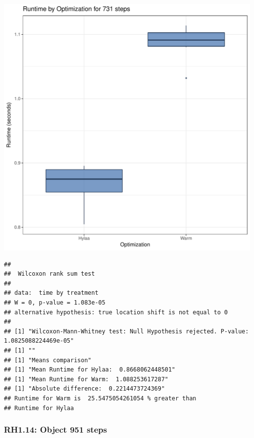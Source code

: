 \documentclass{article}\usepackage[]{graphicx}\usepackage[]{color}
\makeatletter
\def\maxwidth{ %
  \ifdim\Gin@nat@width>\linewidth
    \linewidth
  \else
    \Gin@nat@width
  \fi
}
\newenvironment{kframe}{%
 \def\at@end@of@kframe{}%
 \ifinner\ifhmode%
  \def\at@end@of@kframe{\end{minipage}}%
  \begin{minipage}{\columnwidth}%
 \fi\fi%
 \def\FrameCommand##1{\hskip\@totalleftmargin \hskip-\fboxsep
 \colorbox{shadecolor}{##1}\hskip-\fboxsep
     \hskip-\linewidth \hskip-\@totalleftmargin \hskip\columnwidth}%
 \MakeFramed {\advance\hsize-\width
   \@totalleftmargin\z@ \linewidth\hsize
   \@setminipage}}%
 {\par\unskip\endMakeFramed%
 \at@end@of@kframe}
\newenvironment{knitrout}{}{} %
\makeatother
\begin{document}
\begin{knitrout}
\color{fgcolor}
\includegraphics[width=\maxwidth]{figure/RH1_steps731-1} 
\begin{kframe}\begin{verbatim}
## 
## 	Wilcoxon rank sum test
## 
## data:  time by treatment
## W = 0, p-value = 1.083e-05
## alternative hypothesis: true location shift is not equal to 0
## 
## [1] "Wilcoxon-Mann-Whitney test: Null Hypothesis rejected. P-value: 1.0825088224469e-05"
## [1] ""
## [1] "Means comparison"
## [1] "Mean Runtime for Hylaa:  0.8668062448501"
## [1] "Mean Runtime for Warm:  1.088253617287"
## [1] "Absolute difference:  0.2214473724369"
## Runtime for Warm is  25.5475054261054 % greater than 
## Runtime for Hylaa
\end{verbatim}
\end{kframe}
\end{knitrout}


\subsubsection{RH1.14: Object 951 steps}
\end{document}
